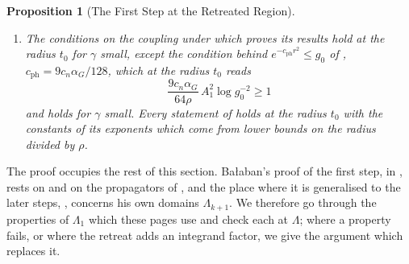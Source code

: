 \documentclass[11pt]{preprint}
\numberwithin{equation}{section}
\newtheorem{proposition}{Proposition}
\theoremstyle{definition}
\theoremstyle{remark}
\theoremstyle{plain}
\begin{document}
\begin{proposition}[The First Step at the Retreated Region]
\begin{enumerate}[label=(\roman*)]
\item The conditions on the coupling under which \cite{WilsonFirstStep} proves its results hold at the radius $t_0$ for $\gamma$ small, except the condition behind $e^{-c_{\mathrm{ph}}r^2} \leq g_0$ of \cite[(9.29)(iii)]{WilsonFirstStep}, $c_{\mathrm{ph}} = 9c_n\alpha_G/128$, which at the radius $t_0$ reads
\begin{equation}\label{eq:retreated-coupling-condition}
    \frac{9c_n\alpha_G}{64\rho}\,A_1^2\log g_0^{-2} \geq 1
\end{equation}
and holds for $\gamma$ small. Every statement of \cite{WilsonFirstStep} holds at the radius $t_0$ with the constants of its exponents which come from lower bounds on the radius divided by $\rho$.
\end{enumerate}
\end{proposition}

The proof occupies the rest of this section. Ba{\l}aban's proof of the first step, in \cite[pp.~247--254]{BalabanCRE}, rests on \cite[Sections~1--2]{BalabanRG2} and on the propagators of \cite[Sections~C--E]{BalabanPBG}, and the place where it is generalised to the later steps, \cite[pp.~277--278]{BalabanCRE}, concerns his own domains $\Lambda_{k+1}$. We therefore go through the properties of $\Lambda_1$ which these pages use and check each at $\Lambda$; where a property fails, or where the retreat adds an integrand factor, we give the argument which replaces it.
\end{document}
